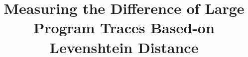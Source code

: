 \documentclass[10pt,journal,cspaper,compsoc]{IEEEtran}
\begin{document}
%
\title{Measuring the Difference of Large Program Traces Based-on
Levenshtein Distance}
%
%
%
%

\end{document}
